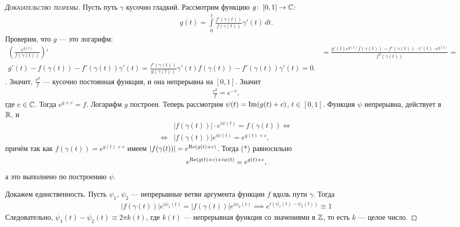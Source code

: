 \documentclass[../../main.tex]{subfiles}
\begin{document}
\begin{proof}[\normalfont\textsc{Доказательство теоремы}]
 Пусть путь $ \gamma $ кусочно гладкий. Рассмотрим функцию $ g \colon\,[0, 1] \to \mathbb{C} $:
 \begin{align*}
  g(t) = \int\limits_{0}^{t} \frac{f'(\gamma(t))}{f(\gamma(t))} \gamma'(t)\,dt.
 \end{align*} Проверим, что $ g $ --- это логарифм:
 \begin{align*}
  \left(\frac{e^{g(t)}}{f(\gamma(t))}\right)' &= \frac{g'(t)e^{g(t)}f(\gamma(t)) - f'(\gamma(t)) \cdot \gamma'(t) \cdot e^{g(t)}}{f^{2}(\gamma(t))} = \\
  g'(t) - f(\gamma(t)) - f'(\gamma(t))\gamma'(t) = \frac{f'(\gamma(t))}{g(\gamma(t))} \gamma'(t) f(\gamma(t)) - f'(\gamma(t)) \gamma'(t) = 0.
 \end{align*}. Значит, $ \frac{e^{g}}{f} $ --- кусочно постоянная функция, и она непрерывна на $ [0,1] $. Значит
 \begin{align*}
  \frac{e^{g}}{f} = e^{-c}, 
 \end{align*} где $ c \in \mathbb{C} $. Тогда $ e^{g+c} = f $. Логарифм $ g $ построен. Теперь рассмотрим $ \psi(t) = \operatorname{Im} (g(t) + c) $, $ t \in [0,1] $. Функция $ \psi $ непрерывна, действует в $ \mathbb{R} $, и
 \begin{align*}
  &\left| f(\gamma(t)) \right| \cdot e^{i\psi(t)} = f(\gamma(t)) \iff \\
  \iff &\left| f(\gamma(t)) \right|e^{i\psi(t)} = e^{g(t) + c},
 \end{align*} причём так как $ f(\gamma(t)) = e^{g(t)+c} $ имеем $ \left| f(\gamma(t)) \right|  = e^{\operatorname{Re}(g(t)+c)}$. Тогда (*) равносильно
 \begin{align*}
  e^{\operatorname{Re}(g(t)+c) + i\psi(t)} = e^{g(t) + c},
 \end{align*} а это выполнено по построению $ \psi $.

 Докажем единственность. Пусть $ \psi_1 $, $ \psi_2 $ --- непрерывные ветви аргумента функции $ f $ вдоль пути $ \gamma $. Тогда
 \begin{align*}
  \left| f(\gamma(t)) \right|e^{i\psi_1(t)} = \left| f(\gamma(t)) \right|e^{i\psi_2(t)} \implies e^{i(\psi_1(t)-\psi_2(t))}  \equiv 1
 \end{align*} Следовательно, $ \psi_1(t) - \psi_2(t) \equiv 2\pi k(t)$, где $ k(t) $ --- непрерывная функция со значениями в $ \mathbb{Z} $, то есть $ k $ --- целое число.
\end{proof}
\end{document}
